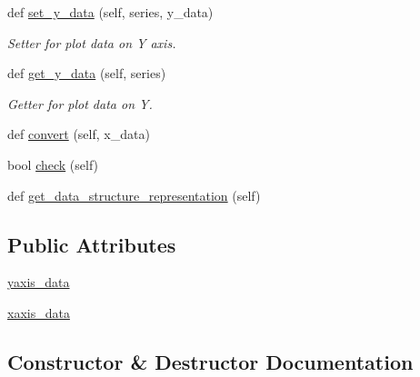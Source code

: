 \begin{DoxyCompactItemize}
def \mbox{\hyperlink{classbridges_1_1line__chart_1_1_line_chart_ae5988ed81be128f96d63526560c61d9f}{set\+\_\+y\+\_\+data}} (self, series, y\+\_\+data)
\begin{DoxyCompactList}\small\item\em Setter for plot data on Y axis. \end{DoxyCompactList}\item 
def \mbox{\hyperlink{classbridges_1_1line__chart_1_1_line_chart_ad598554c70b1524eb900b4a66635e367}{get\+\_\+y\+\_\+data}} (self, series)
\begin{DoxyCompactList}\small\item\em Getter for plot data on Y. \end{DoxyCompactList}\item 
def \mbox{\hyperlink{classbridges_1_1line__chart_1_1_line_chart_ab9d76afae32e71d0a640ac26b13e645c}{convert}} (self, x\+\_\+data)
\item 
bool \mbox{\hyperlink{classbridges_1_1line__chart_1_1_line_chart_ac54bac5a0b78e88d1515dc4ec42dd61f}{check}} (self)
\item 
def \mbox{\hyperlink{classbridges_1_1line__chart_1_1_line_chart_a51cb18ae6ebe1fa514de14b8006cc238}{get\+\_\+data\+\_\+structure\+\_\+representation}} (self)
\end{DoxyCompactItemize}
\subsection*{Public Attributes}
\begin{DoxyCompactItemize}
\item 
\mbox{\hyperlink{classbridges_1_1line__chart_1_1_line_chart_ae32afdcdfe6398ef247f9431de603495}{yaxis\+\_\+data}}
\item 
\mbox{\hyperlink{classbridges_1_1line__chart_1_1_line_chart_a13a52ecfbe82477fd6203aaa7569c1c7}{xaxis\+\_\+data}}
\end{DoxyCompactItemize}


\subsection{Constructor \& Destructor Documentation}
\mbox{\label{classbridges_1_1line__chart_1_1_line_chart_a20c96d892b92624aa367710c9b4386fa}} 
